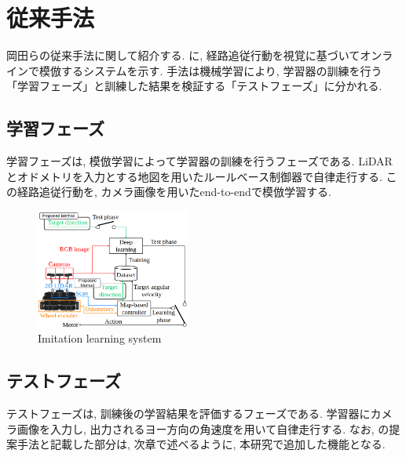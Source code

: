 \documentclass[10pt]{jarticle}
\begin{document}
    \section{従来手法}
    岡田らの従来手法に関して紹介する. 
    に, 経路追従行動を視覚に基づいてオンラインで模倣するシステムを示す. 
    手法は機械学習により, 学習器の訓練を行う「学習フェーズ」と訓練した結果を検証する「テストフェーズ」に分かれる.
    \subsection{学習フェーズ}
    学習フェーズは, 模倣学習によって学習器の訓練を行うフェーズである. LiDARとオドメトリを入力とする地図を用いたルールベース制御器で自律走行する. この経路追従行動を, カメラ画像を用いたend-to-endで模倣学習する.

    \begin{center}
        \begin{figure}[h]
            \centering
            \includegraphics[width=0.45\textwidth]{./fig/system2.png}
            \caption{Imitation learning system}
            \label{fig:sample-fig}
        \end{figure}
    \end{center}

    \subsection{テストフェーズ}

    テストフェーズは, 訓練後の学習結果を評価するフェーズである. 学習器にカメラ画像を入力し, 出力されるヨー方向の角速度を用いて自律走行する.
    なお, の提案手法と記載した部分は, 次章で述べるように, 本研究で追加した機能となる.
\end{document}
